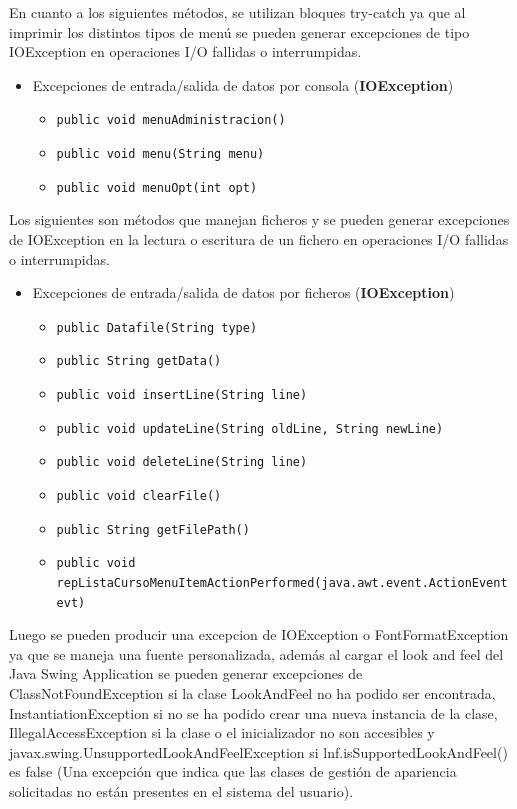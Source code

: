 En cuanto a los siguientes métodos, se utilizan bloques try-catch ya que al imprimir los distintos tipos de menú se pueden generar excepciones de tipo IOException en operaciones I/O fallidas o interrumpidas.

\begin{itemize}
    \item Excepciones de entrada/salida de datos por consola (\textbf{IOException})
    \begin{itemize}
        \item \texttt{public void menuAdministracion()}
        \item \texttt{public void menu(String menu)}
        \item \texttt{public void menuOpt(int opt)}
    \end{itemize}
\end{itemize}

Los siguientes son métodos que manejan ficheros y se pueden generar excepciones de IOException en la lectura o escritura de un fichero en operaciones I/O fallidas o interrumpidas.

\begin{itemize}
    \item Excepciones de entrada/salida de datos por ficheros (\textbf{IOException})
    \begin{itemize}
        \item \texttt{public Datafile(String type)}
        \item \texttt{public String getData()}
        \item \texttt{public void insertLine(String line)}
        \item \texttt{public void updateLine(String oldLine, String newLine)}
        \item \texttt{public void deleteLine(String line)}
        \item \texttt{public void clearFile()}
        \item \texttt{public String getFilePath()}
        \item \texttt{public void repListaCursoMenuItemActionPerformed(java.awt.event.ActionEvent evt)}
    \end{itemize}
\end{itemize}

Luego se pueden producir una excepcion de IOException o FontFormatException ya que se maneja una fuente personalizada, además al cargar el look and feel del Java Swing Application se pueden generar excepciones de ClassNotFoundException si la clase LookAndFeel no ha podido ser encontrada, InstantiationException si no se ha podido crear una nueva instancia de la clase, IllegalAccessException si la clase o el inicializador no son accesibles y javax.swing.UnsupportedLookAndFeelException si lnf.isSupportedLookAndFeel() es false (Una excepción que indica que las clases de gestión de apariencia solicitadas no están presentes en el sistema del usuario).

